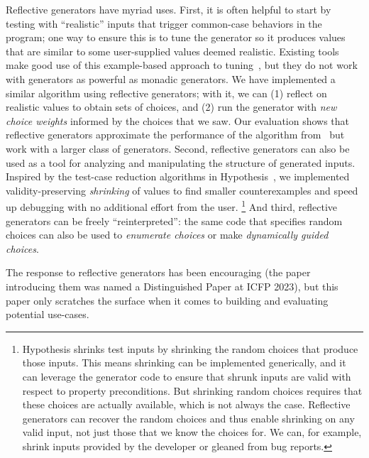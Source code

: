 Reflective generators have myriad uses. First,
%
it is often helpful to start by testing with
``realistic'' inputs that trigger common-case behaviors in the program;
one way to ensure this is to tune the generator so
it produces values that are similar to some user-supplied values deemed
realistic. Existing tools make good use of this example-based approach to
tuning~\cite{soremekun2020inputs}, but they do not work with generators as
powerful as monadic generators. We have implemented a
similar algorithm using
reflective generators; with it, we can (1) reflect on realistic values to
obtain sets of choices, and (2) run the generator with {\em new choice weights}
informed by the choices that we saw. Our evaluation shows that reflective
generators approximate the performance of the algorithm
from~\cite{soremekun2020inputs} but work with a larger class of generators.
%
Second,
reflective generators can also be used as a tool for analyzing and
manipulating the structure of generated inputs. Inspired by the test-case
reduction algorithms in Hypothesis~\cite{maciver_test-case_2020}, we implemented
validity-preserving {\em shrinking} of values to find smaller counterexamples
and speed up debugging with no additional effort from the user.%
%
\footnote{%
\normalsize
Hypothesis shrinks test inputs by shrinking the random choices
that produce those
inputs. This means shrinking can be implemented
generically, and it can leverage the generator code to ensure that shrunk
inputs are valid with respect to property preconditions.  But shrinking
random choices requires that these choices are actually available, which
is not always the case. Reflective generators
can
recover the random choices and thus enable shrinking
on any
valid input, not just those that we know the choices for.  We can, for
example, shrink inputs provided by the developer or
gleaned from bug reports.
}
%
And third, reflective generators can be freely
``reinterpreted'': the same code that specifies random choices can
also be used to {\em enumerate choices} or make {\em dynamically guided choices}.

%
The response to reflective generators has been encouraging (the paper
introducing them was named a Distinguished Paper at ICFP 2023), but
this paper only scratches the surface when it comes to building and
evaluating potential use-cases.

